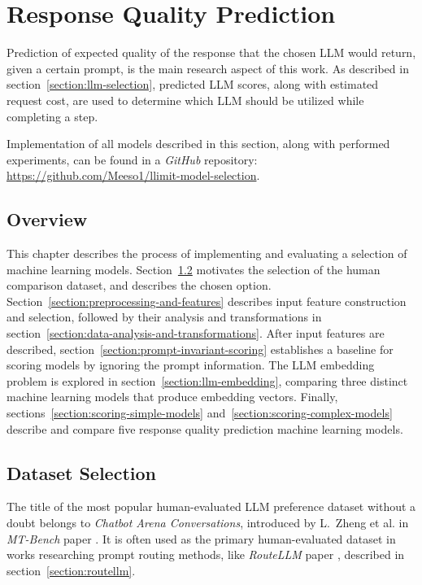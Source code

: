 \documentclass[a4paper,11pt,twoside]{report}
\theoremstyle{definition}
\begin{document}
\chapter{Response Quality Prediction}
\label{section:response-quality-prediction}

Prediction of expected quality of the response that the chosen LLM would return, given a certain prompt, is the main research aspect of this work. As described in section~\ref{section:llm-selection}, predicted LLM scores, along with estimated request cost, are used to determine which LLM should be utilized while completing a step.

Implementation of all models described in this section, along with performed experiments, can be found in a \textit{GitHub} repository: \url{https://github.com/Meeso1/llimit-model-selection}.

\section{Overview}

This chapter describes the process of implementing and evaluating a selection of machine learning models. Section~\ref{section:dataset-selection} motivates the selection of the human comparison dataset, and describes the chosen option. Section~\ref{section:preprocessing-and-features} describes input feature construction and selection, followed by their analysis and transformations in section~\ref{section:data-analysis-and-transformations}. After input features are described, section~\ref{section:prompt-invariant-scoring} establishes a baseline for scoring models by ignoring the prompt information. The LLM embedding problem is explored in section~\ref{section:llm-embedding}, comparing three distinct machine learning models that produce embedding vectors. Finally, sections~\ref{section:scoring-simple-models} and~\ref{section:scoring-complex-models} describe and compare five response quality prediction machine learning models.

\section{Dataset Selection}
\label{section:dataset-selection}

The title of the most popular human-evaluated LLM preference dataset without a doubt belongs to \textit{Chatbot Arena Conversations}, introduced by L.~Zheng et al. in \textit{MT-Bench} paper \cite{zheng2023mtbench}. It is often used as the primary human-evaluated dataset in works researching prompt routing methods, like \textit{RouteLLM} paper \cite{ong2025routellm}, described in section~\ref{section:routellm}.
\end{document}
